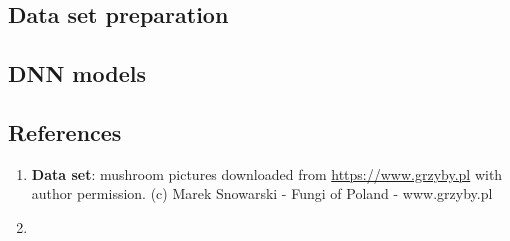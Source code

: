 \documentclass[
]{article}
\begin{document}
\hypertarget{data-set-preparation}{%
\subsection{Data set preparation}\label{data-set-preparation}}

\hfill\break

\hypertarget{dnn-models}{%
\subsection{DNN models}\label{dnn-models}}

\hypertarget{references}{%
\subsection{References}\label{references}}

\begin{enumerate}
\def\labelenumi{\arabic{enumi}.}
\item
  \textbf{Data set}: mushroom pictures downloaded from
  \url{https://www.grzyby.pl} with author permission. (c) Marek
  Snowarski - Fungi of Poland - www.grzyby.pl
\item
\end{enumerate}
\end{document}
